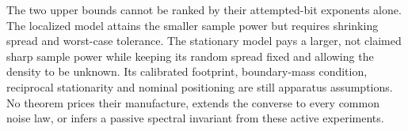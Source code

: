 The two upper bounds cannot be ranked by their attempted-bit exponents
alone. The localized model attains the smaller sample power but requires
shrinking spread and worst-case tolerance. The stationary model pays a
larger, not claimed sharp sample power while keeping its random spread
fixed and allowing the density to be unknown. Its calibrated footprint,
boundary-mass condition, reciprocal stationarity and nominal positioning
are still apparatus assumptions. No theorem prices their manufacture,
extends the converse to every common noise law, or infers a passive
spectral invariant from these active experiments.
